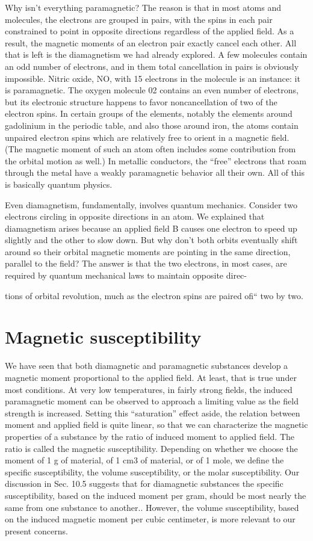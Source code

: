 Why isn't everything paramagnetic? The reason is that in most
atoms and molecules, the electrons are grouped in pairs, with the
spins in each pair constrained to point in opposite directions regardless
of the applied field. As a result, the magnetic moments of an
electron pair exactly cancel each other. All that is left is the 
diamagnetism we had already explored. A few molecules contain an odd
number of electrons, and in them total cancellation in pairs is obviously
impossible. Nitric oxide, NO, with 15 electrons in the molecule
is an instance: it is paramagnetic. The oxygen molecule 02
contains an even number of electrons, but its electronic structure
happens to favor noncancellation of two of the electron spins. In
certain groups of the elements, notably the elements around gadolinium
in the periodic table, and also those around iron, the atoms
contain unpaired electron spins which are relatively free to orient
in a magnetic field. (The magnetic moment of such an atom often
includes some contribution from the orbital motion as well.) In
metallic conductors, the ``free'' electrons that roam through the metal
have a weakly paramagnetic behavior all their own. All of this is
basically quantum physics.

Even diamagnetism, fundamentally, involves quantum mechanics.
Consider two electrons circling in opposite directions in an atom.
We explained that diamagnetism arises because an applied field B
causes one electron to speed up slightly and the other to slow down.
But why don't both orbits eventually shift around so their orbital
magnetic moments are pointing in the same direction, parallel to
the field? The answer is that the two electrons, in most cases, are
required by quantum mechanical laws to maintain opposite direc-

tions of orbital revolution, much as the electron spins are paired ofi``
two by two.

\section{Magnetic susceptibility}

We have seen that both diamagnetic and paramagnetic substances
develop a magnetic moment proportional to the applied field. At
least, that is true under most conditions. At very low temperatures,
in fairly strong fields, the induced paramagnetic moment can be
observed to approach a limiting value as the field strength is 
increased. Setting this ``saturation'' effect aside, the relation between
moment and applied field is quite linear, so that we can characterize
the magnetic properties of a substance by the ratio of induced
moment to applied field. The ratio is called the magnetic 
susceptibility. Depending on whether we choose the moment of 1 g of
material, of 1 cm3 of material, or of 1 mole, we define the specific
susceptibility, the volume susceptibility, or the molar susceptibility.
Our discussion in Sec. 10.5 suggests that for diamagnetic substances
the specific susceptibility, based on the induced moment per gram,
should be most nearly the same from one substance to another..
However, the volume susceptibility, based on the induced magnetic
moment per cubic centimeter, is more relevant to our present
concerns.

